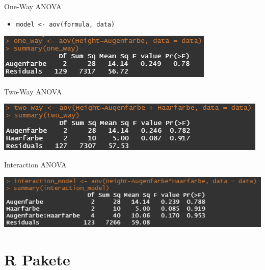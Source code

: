 \documentclass[aspectratio = 169]{chariteBeamer}
\begin{document}
\begin{frame}[fragile]{One-Way ANOVA}
	\begin{itemize}
		\item \verb+model <- aov(formula, data)+
	\end{itemize}	
	\begin{center}
		\includegraphics{OneWay}
	\end{center}
\end{frame}

\begin{frame}[fragile]{Two-Way ANOVA}
	\begin{center}
		\includegraphics{TwoWay}
	\end{center}
\end{frame}

\begin{frame}[fragile]{Interaction ANOVA}
	\begin{center}
		\includegraphics{Interaction}
	\end{center}
\end{frame}





	


\section{\textsf R Pakete}
\end{document}
